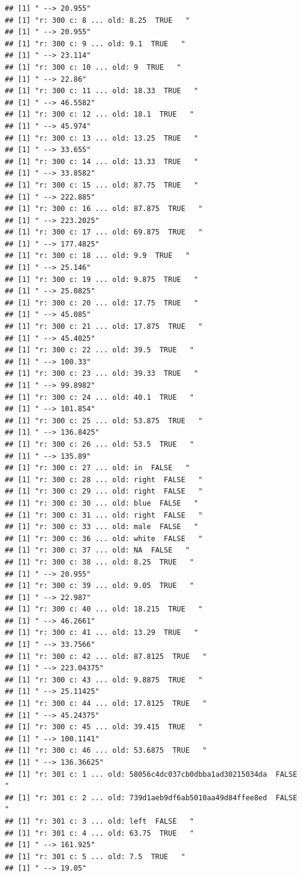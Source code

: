 \documentclass[]{article}
\begin{document}
\begin{verbatim}
## [1] " --> 20.955"
## [1] "r: 300 c: 8 ... old: 8.25  TRUE   "
## [1] " --> 20.955"
## [1] "r: 300 c: 9 ... old: 9.1  TRUE   "
## [1] " --> 23.114"
## [1] "r: 300 c: 10 ... old: 9  TRUE   "
## [1] " --> 22.86"
## [1] "r: 300 c: 11 ... old: 18.33  TRUE   "
## [1] " --> 46.5582"
## [1] "r: 300 c: 12 ... old: 18.1  TRUE   "
## [1] " --> 45.974"
## [1] "r: 300 c: 13 ... old: 13.25  TRUE   "
## [1] " --> 33.655"
## [1] "r: 300 c: 14 ... old: 13.33  TRUE   "
## [1] " --> 33.8582"
## [1] "r: 300 c: 15 ... old: 87.75  TRUE   "
## [1] " --> 222.885"
## [1] "r: 300 c: 16 ... old: 87.875  TRUE   "
## [1] " --> 223.2025"
## [1] "r: 300 c: 17 ... old: 69.875  TRUE   "
## [1] " --> 177.4825"
## [1] "r: 300 c: 18 ... old: 9.9  TRUE   "
## [1] " --> 25.146"
## [1] "r: 300 c: 19 ... old: 9.875  TRUE   "
## [1] " --> 25.0825"
## [1] "r: 300 c: 20 ... old: 17.75  TRUE   "
## [1] " --> 45.085"
## [1] "r: 300 c: 21 ... old: 17.875  TRUE   "
## [1] " --> 45.4025"
## [1] "r: 300 c: 22 ... old: 39.5  TRUE   "
## [1] " --> 100.33"
## [1] "r: 300 c: 23 ... old: 39.33  TRUE   "
## [1] " --> 99.8982"
## [1] "r: 300 c: 24 ... old: 40.1  TRUE   "
## [1] " --> 101.854"
## [1] "r: 300 c: 25 ... old: 53.875  TRUE   "
## [1] " --> 136.8425"
## [1] "r: 300 c: 26 ... old: 53.5  TRUE   "
## [1] " --> 135.89"
## [1] "r: 300 c: 27 ... old: in  FALSE   "
## [1] "r: 300 c: 28 ... old: right  FALSE   "
## [1] "r: 300 c: 29 ... old: right  FALSE   "
## [1] "r: 300 c: 30 ... old: blue  FALSE   "
## [1] "r: 300 c: 31 ... old: right  FALSE   "
## [1] "r: 300 c: 33 ... old: male  FALSE   "
## [1] "r: 300 c: 36 ... old: white  FALSE   "
## [1] "r: 300 c: 37 ... old: NA  FALSE   "
## [1] "r: 300 c: 38 ... old: 8.25  TRUE   "
## [1] " --> 20.955"
## [1] "r: 300 c: 39 ... old: 9.05  TRUE   "
## [1] " --> 22.987"
## [1] "r: 300 c: 40 ... old: 18.215  TRUE   "
## [1] " --> 46.2661"
## [1] "r: 300 c: 41 ... old: 13.29  TRUE   "
## [1] " --> 33.7566"
## [1] "r: 300 c: 42 ... old: 87.8125  TRUE   "
## [1] " --> 223.04375"
## [1] "r: 300 c: 43 ... old: 9.8875  TRUE   "
## [1] " --> 25.11425"
## [1] "r: 300 c: 44 ... old: 17.8125  TRUE   "
## [1] " --> 45.24375"
## [1] "r: 300 c: 45 ... old: 39.415  TRUE   "
## [1] " --> 100.1141"
## [1] "r: 300 c: 46 ... old: 53.6875  TRUE   "
## [1] " --> 136.36625"
## [1] "r: 301 c: 1 ... old: 58056c4dc037cb0dbba1ad30215034da  FALSE   "
## [1] "r: 301 c: 2 ... old: 739d1aeb9df6ab5010aa49d84ffee8ed  FALSE   "
## [1] "r: 301 c: 3 ... old: left  FALSE   "
## [1] "r: 301 c: 4 ... old: 63.75  TRUE   "
## [1] " --> 161.925"
## [1] "r: 301 c: 5 ... old: 7.5  TRUE   "
## [1] " --> 19.05"

\end{verbatim}
\end{document}
